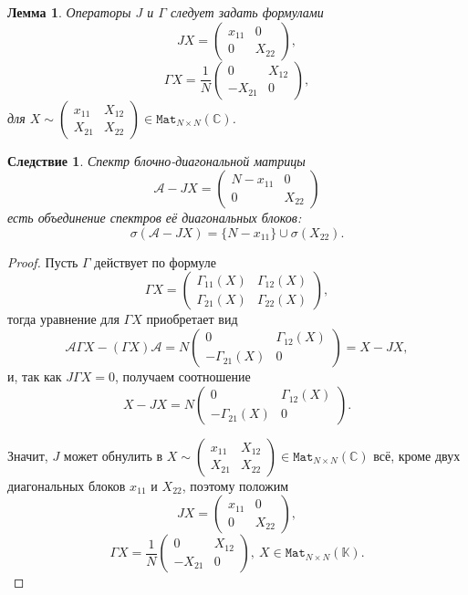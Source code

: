 \documentclass[14pt,a4paper]{extarticle}
\numberwithin{equation}{section}
\newtheorem{lem}{Лемма}
\newtheorem{crl}{Следствие}
\theoremstyle{definition}
\begin{document}
\begin{lem}
    Операторы \( J \) и \( \Gamma \)
    следует задать формулами
    \[
        J X = \begin{pmatrix} x_{11} & 0 \\ 0 & X_{22} \end{pmatrix}, \]
    \[
        \Gamma X = \frac{1}{N} \begin{pmatrix} 0 & X_{12} \\ -X_{21} & 0 \end{pmatrix}, \]
        для \( X\sim \begin{pmatrix}x_{11} & X_{12} \\ X_{21} & X_{22}\end{pmatrix} \in \mathtt{Mat}_{N{\times}N}(\mathbb{C}) \).

\end{lem}
\begin{crl}
    Спектр блочно-диагональной матрицы
    \[ \mathcal{A} - JX = \begin{pmatrix} N - x_{11} & 0 \\ 0 & X_{22} \end{pmatrix} \]
    есть объединение спектров е\"е диагональных блоков:
    \[
        \sigma(\mathcal{A} - J X) = \{ N - x_{11} \} \cup \sigma(X_{22}). \]
\end{crl}
\begin{proof}
Пусть \( \Gamma \) действует по формуле
\[ \Gamma X = \begin{pmatrix} \Gamma_{11}(X) & \Gamma_{12}(X) \\
                              \Gamma_{21}(X) & \Gamma_{22}(X)
                            \end{pmatrix}, \]
тогда уравнение для \( \Gamma X \) приобретает вид
    \[
        \mathcal{A} \Gamma X - (\Gamma X)\mathcal{A} =
        N
        \begin{pmatrix}
          0 & \Gamma_{12}(X) \\
          -\Gamma_{21}(X) & 0
        \end{pmatrix} = X - JX,
     \]
     и, так как \( J\Gamma X = 0 \), получаем соотношение
\[
    X - J X =
    N \begin{pmatrix} 0 & \Gamma_{12}(X) \\
        - \Gamma_{21}(X) & 0
        \end{pmatrix}. \]

Значит, \( J \) может обнулить в
    \( X \sim
    \begin{pmatrix}
    x_{11} & X_{12} \\
    X_{21} & X_{22}
    \end{pmatrix} \in \mathtt{Mat}_{N{\times}N}(\mathbb{C}) \)
    вс\"е, кроме двух диагональных блоков \( x_{11} \) и \( X_{22} \),
    поэтому положим
\[
    J X = \begin{pmatrix} x_{11} & 0 \\ 0 & X_{22} \end{pmatrix}, \]
\[
    \Gamma X = \frac{1}{N} \begin{pmatrix} 0 & X_{12} \\ -X_{21} &
      0 \end{pmatrix},\ X\in\mathtt{Mat}_{N{\times}N}(\mathbb{K}). 
\]
\end{proof}
\end{document}
